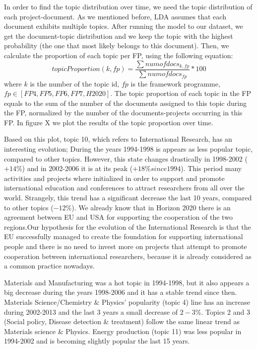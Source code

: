 \documentclass[12pt]{report}
\begin{document}
In order to find the topic distribution over time, we need the topic
distribution of each project-document. As we mentioned before, LDA assumes that
each document exhibits multiple topics. After running the model to our dataset,
we get the document-topic distribution and we keep the topic with the highest
probability (the one that most likely belongs to this document). Then, we
calculate the proportion of each topic per FP, using the following equation:
\begin{equation}
topicProportion(k, fp) = \frac{\sum num of docs_{k,fp}}{\sum num of docs_{fp}} * 100
\end{equation}
where $k$ is the number of the topic id, $fp$ is the framework programme,
$fp \in [FP4, FP5, FP6, FP7, H2020]$. The topic proportion of each topic in 
the FP equals to the sum of the number of the documents assigned to this 
topic during the FP, normalized by the number of the documents-projects 
occurring in this FP. In figure X we plot the results of the topic proportion 
over time.

Based on this plot, topic 10, which refers to International Research, has an
interesting evolution; During the years 1994-1998 is appears as less popular
topic, compared to other topics. However, this state changes drastically in
1998-2002 ($+14\%$) and in 2002-2006 it is at its peak ($+18\% since 1994$).
This period many activities and projects where initialized in order to support
and promote international education and conferences to attract researchers from
all over the world. Strangely, this trend has a significant decrease the last 10
years, compared to other topics ($-12\%$). We already know that in Horizon 2020
there is an agreement between EU and USA for supporting the cooperation of the
two regions.Our hypothesis for the evolution of the International Research is
that the EU successfully managed to create the foundation for supporting
international people and there is no need to invest more on projects that
attempt to promote cooperation between international researchers, because it is
already considered as a common practice nowadays.

Materials and Manufacturing was a hot topic in 1994-1998, but it also appears a
big decrease during the years 1998-2006 and it has a stable trend since then.
Materials Science/Chemistry \& Physics' popularity (topic 4) line has an
increase during 2002-2013 and the last 3 years a small decrease of $2-3\%$.
Topics 2 and 3 (Social policy, Disease detection \& treatment) follow the same
linear trend as Materials science \& Physics. Energy production (topic 11) was
less popular in 1994-2002 and is becoming slightly popular the last 15 years.
\end{document}
